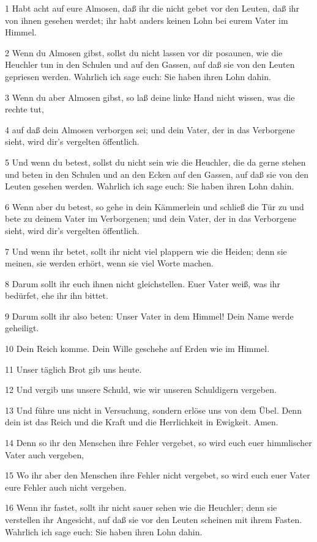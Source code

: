 \par 1 Habt acht auf eure Almosen, daß ihr die nicht gebet vor den Leuten, daß ihr von ihnen gesehen werdet; ihr habt anders keinen Lohn bei eurem Vater im Himmel.
\par 2 Wenn du Almosen gibst, sollst du nicht lassen vor dir posaunen, wie die Heuchler tun in den Schulen und auf den Gassen, auf daß sie von den Leuten gepriesen werden. Wahrlich ich sage euch: Sie haben ihren Lohn dahin.
\par 3 Wenn du aber Almosen gibst, so laß deine linke Hand nicht wissen, was die rechte tut,
\par 4 auf daß dein Almosen verborgen sei; und dein Vater, der in das Verborgene sieht, wird dir's vergelten öffentlich.
\par 5 Und wenn du betest, sollst du nicht sein wie die Heuchler, die da gerne stehen und beten in den Schulen und an den Ecken auf den Gassen, auf daß sie von den Leuten gesehen werden. Wahrlich ich sage euch: Sie haben ihren Lohn dahin.
\par 6 Wenn aber du betest, so gehe in dein Kämmerlein und schließ die Tür zu und bete zu deinem Vater im Verborgenen; und dein Vater, der in das Verborgene sieht, wird dir's vergelten öffentlich.
\par 7 Und wenn ihr betet, sollt ihr nicht viel plappern wie die Heiden; denn sie meinen, sie werden erhört, wenn sie viel Worte machen.
\par 8 Darum sollt ihr euch ihnen nicht gleichstellen. Euer Vater weiß, was ihr bedürfet, ehe ihr ihn bittet.
\par 9 Darum sollt ihr also beten: Unser Vater in dem Himmel! Dein Name werde geheiligt.
\par 10 Dein Reich komme. Dein Wille geschehe auf Erden wie im Himmel.
\par 11 Unser täglich Brot gib uns heute.
\par 12 Und vergib uns unsere Schuld, wie wir unseren Schuldigern vergeben.
\par 13 Und führe uns nicht in Versuchung, sondern erlöse uns von dem Übel. Denn dein ist das Reich und die Kraft und die Herrlichkeit in Ewigkeit. Amen.
\par 14 Denn so ihr den Menschen ihre Fehler vergebet, so wird euch euer himmlischer Vater auch vergeben,
\par 15 Wo ihr aber den Menschen ihre Fehler nicht vergebet, so wird euch euer Vater eure Fehler auch nicht vergeben.
\par 16 Wenn ihr fastet, sollt ihr nicht sauer sehen wie die Heuchler; denn sie verstellen ihr Angesicht, auf daß sie vor den Leuten scheinen mit ihrem Fasten. Wahrlich ich sage euch: Sie haben ihren Lohn dahin.
